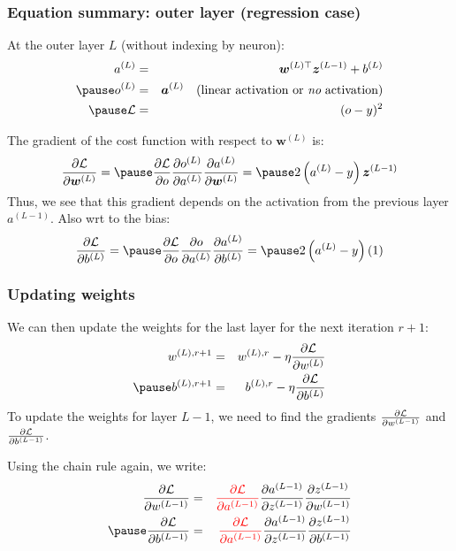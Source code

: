 \documentclass[smaller]{beamer}
\begin{document}
\begin{frame}
  \frametitle{Equation summary: outer layer (regression case)}
  \pause
  At the outer layer $L$ (without indexing by neuron):\pause
  \begin{eqnarray}
    a^{(L)} &=& \bm w^{(L)\top} \bm z^{(L-1)} + b^{(L)} \\\pause
    o^{(L)} &=& \bm a^{(L)}  \quad \text{(linear activation or {\it no} activation)} \\\pause
    \mc{L} &=& (o  - y)^2
  \end{eqnarray}
  \pause
  
  The gradient of the cost function with respect to $\bm w^{(L)}$ is:\pause
  \begin{equation}
    \frac{\partial \mc{L}}{\partial \bm w^{(L)}}
    =\pause
    \frac{\partial \mc{L}}{\partial  o}
    \frac{\partial o^{(L)}}{\partial a^{(L)}}
    \frac{\partial a^{(L)}}{\partial \bm w^{(L)}}
    =\pause
    2 \left(a^{(L)} - y \right) \bm z^{(L-1)}
  \end{equation}
  \pause
  Thus, we see that this gradient depends on the activation from the previous layer $a^{(L-1)}$. \pause Also wrt to the bias:
  \begin{equation}
    \pd{\mc{L}}{b^{(L)}} = \pause \pd{\mc{L}}{o}\pd{o}{a^{(L)}}\pd{a^{(L)}}{b^{(L)}} =\pause 2\lt(a^{(L)} - y\rt)(1)
  \end{equation}
\end{frame}

\begin{frame}
  \frametitle{Updating weights}
  \pause
  We can then update the weights for the last layer for the next iteration $r+1$:\pause
  \begin{eqnarray}
    w^{(L), r+1}  &=&  w^{(L),r} - \eta \pd{\mc{L}}{w^{(L)}}  \\\pause
    b^{(L), r+1}  &=&  b^{(L),r} - \eta \pd{\mc{L}}{b^{(L)}}  
  \end{eqnarray}
  \pause
  To update the weights for layer $L-1$, we need to find the gradients $\frac{\partial{\mathcal{L}}}{\partial{w^{(L-1)}}}$ and $\frac{\partial{\mathcal{L}}}{\partial{b^{(L-1)}}}$.

  \pause

  \medskip
  
  Using the chain rule again, we write:\pause
  \begin{eqnarray}
    \pd{\mc{L}}{w^{(L-1)}} &=& {\rd \pd{\mc{L}}{a^{(L-1)}}}\pd{a^{(L-1)}}{z^{(L-1)}}\pd{z^{(L-1)}}{w^{(L-1)}} \\\pause
    \pd{\mc{L}}{b^{(L-1)}} &=& {\rd \pd{\mc{L}}{a^{(L-1)}}}\pd{a^{(L-1)}}{z^{(L-1)}}\pd{z^{(L-1)}}{b^{(L-1)}} 
  \end{eqnarray}
\end{frame}
\end{document}
